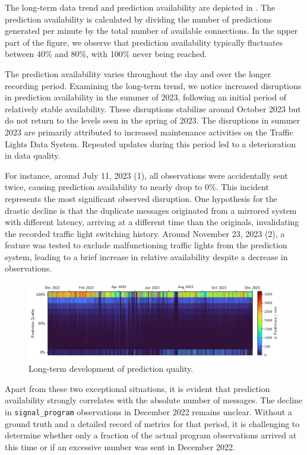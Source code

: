 The long-term data trend and prediction availability are depicted in . The prediction availability is calculated by dividing the number of predictions generated per minute by the total number of available connections. In the upper part of the figure, we observe that prediction availability typically fluctuates between 40\% and 80\%, with 100\% never being reached.

The prediction availability varies throughout the day and over the longer recording period. Examining the long-term trend, we notice increased disruptions in prediction availability in the summer of 2023, following an initial period of relatively stable availability. These disruptions stabilize around October 2023 but do not return to the levels seen in the spring of 2023. The disruptions in summer 2023 are primarily attributed to increased maintenance activities on the Traffic Lights Data System. Repeated updates during this period led to a deterioration in data quality. 

For instance, around July 11, 2023 (1), all observations were accidentally sent twice, causing prediction availability to nearly drop to 0\%. This incident represents the most significant observed disruption. One hypothesis for the drastic decline is that the duplicate messages originated from a mirrored system with different latency, arriving at a different time than the originals, invalidating the recorded traffic light switching history. Around November 23, 2023 (2), a feature was tested to exclude malfunctioning traffic lights from the prediction system, leading to a brief increase in relative availability despite a decrease in observations.

\begin{figure}[t]
    \centering
    \includegraphics[width=\linewidth]{images/monitoring-long-term-study.pdf}
    \caption{Long-term development of prediction quality.}\label{fig:monitoring-long-term-study}
\end{figure}

Apart from these two exceptional situations, it is evident that prediction availability strongly correlates with the absolute number of messages. The decline in \texttt{signal\_program} observations in December 2022 remains unclear. Without a ground truth and a detailed record of metrics for that period, it is challenging to determine whether only a fraction of the actual program observations arrived at this time or if an excessive number was sent in December 2022.

